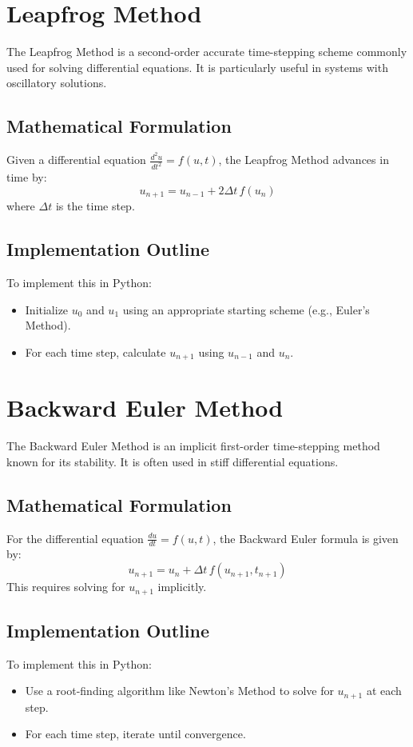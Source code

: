 \documentclass{article}
\begin{document}
\section{Leapfrog Method}
The Leapfrog Method is a second-order accurate time-stepping scheme commonly used for solving differential equations. It is particularly useful in systems with oscillatory solutions.

\subsection{Mathematical Formulation}
Given a differential equation $\frac{d^2 u}{dt^2} = f(u, t)$, the Leapfrog Method advances in time by:
\[
u_{n+1} = u_{n-1} + 2 \Delta t \, f\left( u_n \right)
\]
where $\Delta t$ is the time step.

\subsection{Implementation Outline}
To implement this in Python:
\begin{itemize}
    \item Initialize $u_0$ and $u_1$ using an appropriate starting scheme (e.g., Euler's Method).
    \item For each time step, calculate $u_{n+1}$ using $u_{n-1}$ and $u_n$.
\end{itemize}

\section{Backward Euler Method}
The Backward Euler Method is an implicit first-order time-stepping method known for its stability. It is often used in stiff differential equations.

\subsection{Mathematical Formulation}
For the differential equation $\frac{du}{dt} = f(u, t)$, the Backward Euler formula is given by:
\[
u_{n+1} = u_n + \Delta t \, f(u_{n+1}, t_{n+1})
\]
This requires solving for $u_{n+1}$ implicitly.

\subsection{Implementation Outline}
To implement this in Python:
\begin{itemize}
    \item Use a root-finding algorithm like Newton's Method to solve for $u_{n+1}$ at each step.
    \item For each time step, iterate until convergence.
\end{itemize}
\end{document}

